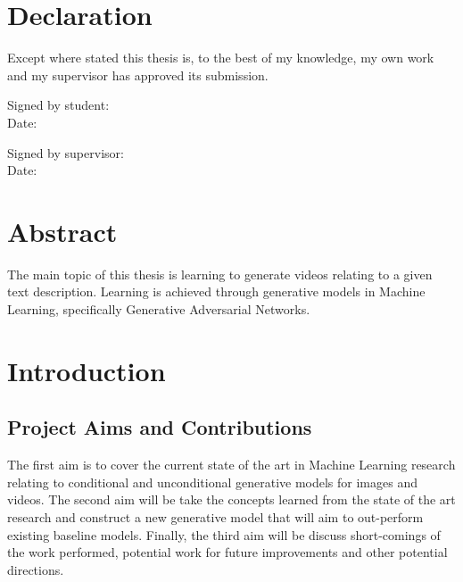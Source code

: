 \documentclass{report}
\theoremstyle{plain}
\theoremstyle{definition}
\theoremstyle{remark}
\numberwithin{equation}{section}
\numberwithin{figure}{section}
\newcommand{\<}{\langle}
\renewcommand{\>}{\rangle}
\begin{document}
\chapter*{Declaration}

Except where stated this thesis is, to the best of my knowledge, my own work and my supervisor has approved its submission.

\vspace{20 pt}

\begin{flushleft}
Signed by student:  \\[15 pt]
Date:
\end{flushleft}

\vspace{20 pt}
\begin{flushleft}
Signed by supervisor:\\[15 pt]
Date:
\end{flushleft}





\chapter*{Abstract}

The main topic of this thesis is learning to generate videos relating to a given text description. Learning is achieved through generative models in Machine Learning, specifically Generative Adversarial Networks.

\tableofcontents

%
%
\chapter*{Introduction}


\section{Project Aims and Contributions}

The first aim is to cover the current state of the art in Machine Learning research relating to conditional and unconditional generative models for images and videos. The second aim will be take the concepts learned from the state of the art research and construct a new generative model that will aim to out-perform existing baseline models. Finally, the third aim will be discuss short-comings of the work performed, potential work for future improvements and other potential directions.
\end{document}
